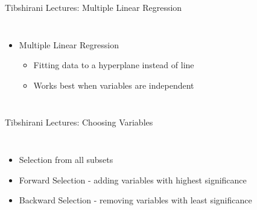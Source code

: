 \documentclass{beamer}
\begin{document}
\begin{frame}{Tibshirani Lectures: Multiple Linear Regression}
\begin{columns}
	\begin{itemize}
		\item<1-> Multiple Linear Regression
		\begin{itemize}
			\item<1-> Fitting data to a hyperplane instead of line
			\item<1-> Works best when variables are independent
		\end{itemize}
	\end{itemize}
\end{columns}	
\end{frame}

\begin{frame}{Tibshirani Lectures: Choosing Variables}
\begin{columns}
	\begin{itemize}
		\item<1-> Selection from all subsets
		\item<2-> Forward Selection - adding variables with highest significance
		\item<3-> Backward Selection - removing variables with least significance
	\end{itemize}
\end{columns}	
\end{frame}

\end{document}
